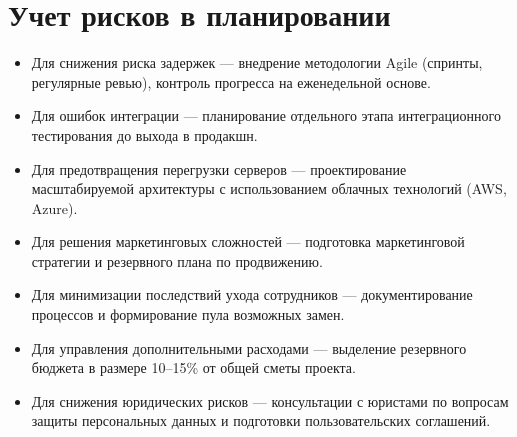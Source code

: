 \documentclass[14pt, russian]{matmex-diploma-custom}
\begin{document}
\section{Учет рисков в планировании}

\begin{itemize}
    \item Для снижения риска задержек — внедрение методологии Agile (спринты, регулярные ревью), контроль прогресса на еженедельной основе.
    \item Для ошибок интеграции — планирование отдельного этапа интеграционного тестирования до выхода в продакшн.
    \item Для предотвращения перегрузки серверов — проектирование масштабируемой архитектуры с использованием облачных технологий (AWS, Azure).
    \item Для решения маркетинговых сложностей — подготовка маркетинговой стратегии и резервного плана по продвижению.
    \item Для минимизации последствий ухода сотрудников — документирование процессов и формирование пула возможных замен.
    \item Для управления дополнительными расходами — выделение резервного бюджета в размере 10--15\% от общей сметы проекта.
    \item Для снижения юридических рисков — консультации с юристами по вопросам защиты персональных данных и подготовки пользовательских соглашений.
\end{itemize}
\end{document}
